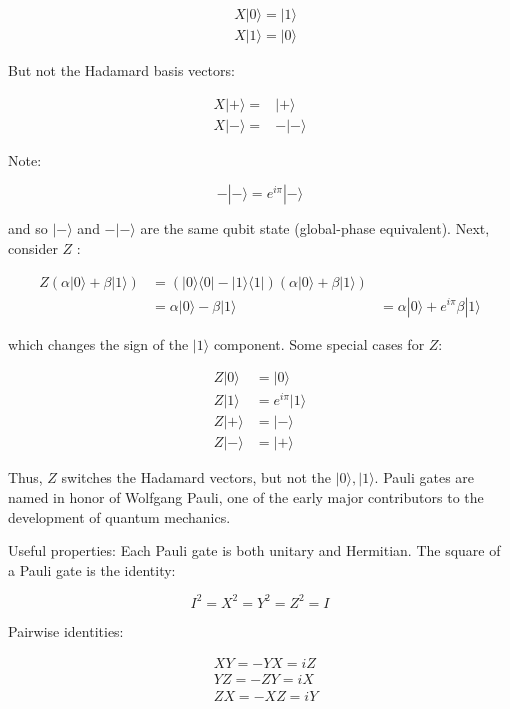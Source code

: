 \documentclass[main.tex]{subfiles}
\begin{document}
    $$
    \begin{aligned}
    &X|0\rangle=|1\rangle \\
    &X|1\rangle=|0\rangle
    \end{aligned}
    $$
    
    But not the Hadamard basis vectors:
    
    $$
    \begin{array}{ll}
    X|+\rangle= & |+\rangle \\
    X|-\rangle= & -|-\rangle
    \end{array}
    $$
    
    Note:
    
    $$
    -|-\rangle=e^{i \pi}|-\rangle
    $$
    
    and so $|-\rangle$ and $-|-\rangle$ are the same qubit state (global-phase equivalent). Next, consider $Z$ :
    
    $$
    \begin{array}{rlr}
    Z(\alpha|0\rangle+\beta|1\rangle) & =(|0\rangle\langle 0|-| 1\rangle\langle 1|)(\alpha|0\rangle+\beta|1\rangle) & \\
    & =\alpha|0\rangle-\beta|1\rangle & =\alpha|0\rangle+e^{i \pi} \beta|1\rangle
    \end{array}
    $$
    
    which changes the sign of the $|1\rangle$ component. Some special cases for $Z$:
    
    $$
    \begin{aligned}
    Z|0\rangle &=|0\rangle \\
    Z|1\rangle &=e^{i \pi}|1\rangle \\
    Z|+\rangle &=|-\rangle \\
    Z|-\rangle &=|+\rangle
    \end{aligned}
    $$
    
    Thus, $Z$ switches the Hadamard vectors, but not the $|0\rangle,|1\rangle$. Pauli gates are named in honor of Wolfgang Pauli, one of the early major contributors to the development of quantum mechanics.
    
    Useful properties: Each Pauli gate is both unitary and Hermitian. The square of a Pauli gate is the identity:
    
    $$
    I^{2}=X^{2}=Y^{2}=Z^{2}=I
    $$
    
    Pairwise identities:
    
    $$
    \begin{aligned}
    &X Y=-Y X=i Z \\
    &Y Z=-Z Y=i X \\
    &Z X=-X Z=i Y
    \end{aligned}
    $$
    
\end{document}

